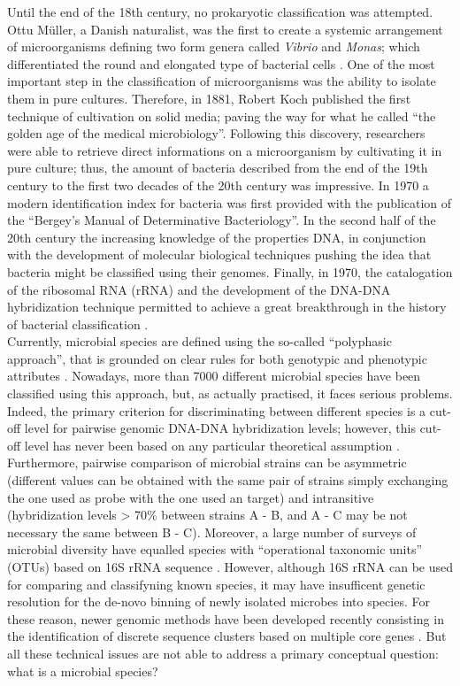 Until the end of the 18th century, no prokaryotic classification was attempted. Ottu M\"{u}ller, a Danish naturalist, was the first to create a systemic arrangement of microorganisms defining two form genera called \textit{Vibrio} and \textit{Monas}; which differentiated the round and elongated type of bacterial cells \cite{logan2009bacterial}. One of the most important step in the classification of microorganisms was the ability to isolate them in pure cultures. Therefore, in 1881, Robert Koch published the first technique of cultivation on solid media; paving the way for what he called ``the golden age of the medical microbiology''. Following this discovery, researchers were able to retrieve direct informations on a microorganism by cultivating it in pure culture; thus, the amount of bacteria described from the end of the 19th century to the first two decades of the 20th century was impressive. In 1970  a modern identification index for bacteria was first provided with the publication of the ``Bergey's Manual of Determinative Bacteriology''. In the second half of the 20th century the increasing knowledge of the properties DNA, in conjunction with the development of molecular biological techniques pushing the idea that bacteria might be classified using their genomes. Finally, in 1970, the catalogation of the ribosomal RNA (rRNA) and the development of the DNA-DNA hybridization technique permitted to achieve a great breakthrough in the history of bacterial classification \cite{stackebrandt198516, de1975improvements}.\\
Currently, microbial species are defined using the so-called ``polyphasic approach'', that is grounded on clear rules for both genotypic and phenotypic attributes \cite{vandamme1996polyphasic}. Nowadays, more than 7000 different microbial species have been classified using this approach, but, as actually practised, it faces serious problems. Indeed, the primary criterion for discriminating between different species is a cut-off level for pairwise genomic DNA-DNA hybridization levels; however, this cut-off level has never been based on any particular theoretical assumption \cite{de2005ernst, hey2006failure}. Furthermore, pairwise comparison of microbial strains can be asymmetric (different values can be obtained with the same pair of strains simply exchanging the one used as probe with the one used an target) and intransitive (hybridization levels > 70\% between strains A - B, and A - C may be not necessary the same between B - C). Moreover, a large number of surveys of microbial diversity have equalled species with ``operational taxonomic units'' (OTUs) based on 16S rRNA sequence \cite{ley2006microbial}. However, although 16S rRNA can be used for comparing and classifyning known species, it may have insufficent genetic resolution for the de-novo binning of newly isolated microbes into species. For these reason, newer genomic methods have been developed recently consisting in the identification of discrete sequence clusters based on multiple core genes \cite{fraser2007recombination, gevers2005re}. But all these technical issues are not able to address a primary conceptual question: what is a microbial species?\\
